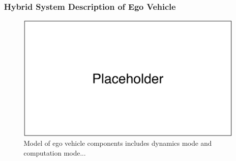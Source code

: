 \subsubsection{Hybrid System Description of Ego Vehicle}
\label{sect:hybrid-system}

\begin{figure}
	\centering
	\includegraphics[scale=0.5]{figures/placeholder}
	\caption{Model of ego vehicle components includes dynamics mode and computation mode...}
	\label{fig:ego-hybrid-sys}
\end{figure}